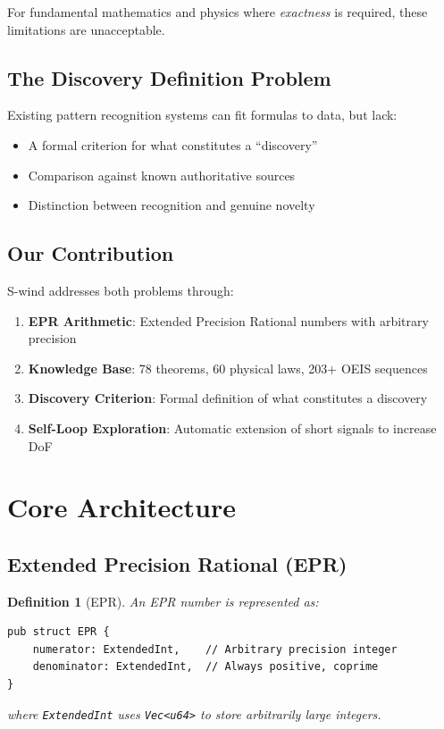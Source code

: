 \documentclass[11pt,a4paper]{article}
\newtheorem{definition}{Definition}
\begin{document}
For fundamental mathematics and physics where \emph{exactness} is required, these limitations are unacceptable.

\subsection{The Discovery Definition Problem}

Existing pattern recognition systems can fit formulas to data, but lack:
\begin{itemize}
    \item A formal criterion for what constitutes a ``discovery''
    \item Comparison against known authoritative sources
    \item Distinction between recognition and genuine novelty
\end{itemize}

\subsection{Our Contribution}

S-wind addresses both problems through:
\begin{enumerate}
    \item \textbf{EPR Arithmetic}: Extended Precision Rational numbers with arbitrary precision
    \item \textbf{Knowledge Base}: 78 theorems, 60 physical laws, 203+ OEIS sequences
    \item \textbf{Discovery Criterion}: Formal definition of what constitutes a discovery
    \item \textbf{Self-Loop Exploration}: Automatic extension of short signals to increase DoF
\end{enumerate}

\section{Core Architecture}

\subsection{Extended Precision Rational (EPR)}

\begin{definition}[EPR]
An EPR number is represented as:
\begin{verbatim}
pub struct EPR {
    numerator: ExtendedInt,    // Arbitrary precision integer
    denominator: ExtendedInt,  // Always positive, coprime
}
\end{verbatim}
where \texttt{ExtendedInt} uses \texttt{Vec<u64>} to store arbitrarily large integers.
\end{definition}
\end{document}
